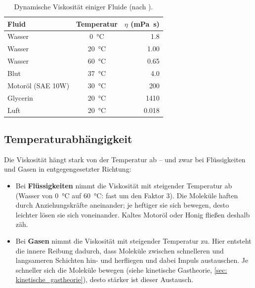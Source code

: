 \begin{table}[htb]
    \centering
    \caption{Dynamische Viskosität einiger Fluide (nach \cite[S.~396]{Tipler2015}).}\label{tab: viskositaet}
    \vspace{4pt}
    \begin{tabular}{l c r}
        \toprule
        \textbf{Fluid} & \textbf{Temperatur} & \textbf{$\eta$ (\si{\milli\pascal\second})} \\
        \midrule
        Wasser & \SI{0}{\celsius} & \num{1.8} \\
        Wasser & \SI{20}{\celsius} & \num{1.00} \\
        Wasser & \SI{60}{\celsius} & \num{0.65} \\
        Blut & \SI{37}{\celsius} & \num{4.0} \\
        Motoröl (SAE 10W) & \SI{30}{\celsius} & \num{200} \\
        Glycerin & \SI{20}{\celsius} & \num{1410} \\
        Luft & \SI{20}{\celsius} & \num{0.018} \\
        \bottomrule
    \end{tabular}
\end{table}

\subsection{Temperaturabhängigkeit}
Die Viskosität hängt stark von der Temperatur ab -- und zwar bei Flüssigkeiten und Gasen in entgegengesetzter Richtung:
\begin{itemize}[itemsep=1.5pt]
    \item Bei \textbf{Flüssigkeiten} nimmt die Viskosität mit steigender Temperatur ab (Wasser von \SI{0}{\celsius} auf \SI{60}{\celsius}: fast um den Faktor 3). Die Moleküle haften durch Anziehungskräfte aneinander; je heftiger sie sich bewegen, desto leichter lösen sie sich voneinander. Kaltes Motoröl oder Honig fließen deshalb zäh.
    \item Bei \textbf{Gasen} nimmt die Viskosität mit steigender Temperatur zu. Hier entsteht die innere Reibung dadurch, dass Moleküle zwischen schnelleren und langsameren Schichten hin- und herfliegen und dabei Impuls austauschen. Je schneller sich die Moleküle bewegen (siehe kinetische Gastheorie, \cref{sec: kinetische_gastheorie}), desto stärker ist dieser Austausch.
\end{itemize}

